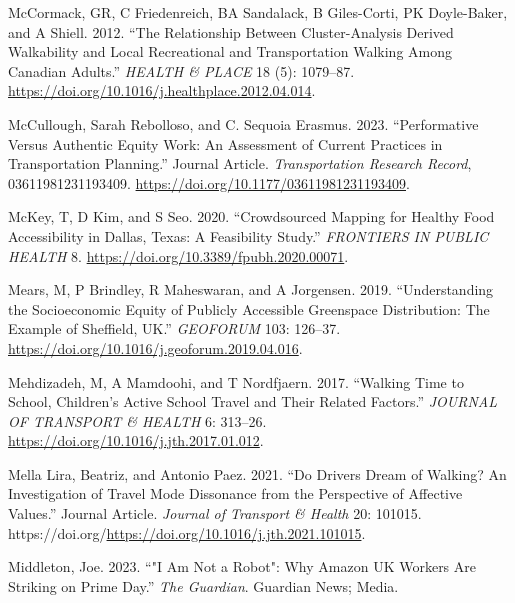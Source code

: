 \documentclass[12pt, oneside]{report}
\newlength{\cslhangindent}
\newlength{\cslentryspacingunit} %
\newenvironment{CSLReferences}[2] %
 {%
  \setlength{\parindent}{0pt}
  \ifodd #1
  \let\oldpar\par
  \def\par{\hangindent=\cslhangindent\oldpar}
  \fi
  \setlength{\parskip}{#2\cslentryspacingunit}
 }%
 {}
\begin{document}
\begin{CSLReferences}{1}{0}
\leavevmode{}%
McCormack, GR, C Friedenreich, BA Sandalack, B Giles-Corti, PK
Doyle-Baker, and A Shiell. 2012. {``The Relationship Between
Cluster-Analysis Derived Walkability and Local Recreational and
Transportation Walking Among {Canadian} Adults.''} \emph{HEALTH \&
PLACE} 18 (5): 1079--87.
\url{https://doi.org/10.1016/j.healthplace.2012.04.014}.

\leavevmode{}%
McCullough, Sarah Rebolloso, and C. Sequoia Erasmus. 2023.
{``Performative Versus Authentic Equity Work: An Assessment of Current
Practices in Transportation Planning.''} Journal Article.
\emph{Transportation Research Record}, 03611981231193409.
\url{https://doi.org/10.1177/03611981231193409}.

\leavevmode{}%
McKey, T, D Kim, and S Seo. 2020. {``Crowdsourced {Mapping} for {Healthy
Food Accessibility} in {Dallas}, {Texas}: {A Feasibility Study}.''}
\emph{FRONTIERS IN PUBLIC HEALTH} 8.
\url{https://doi.org/10.3389/fpubh.2020.00071}.

\leavevmode{}%
Mears, M, P Brindley, R Maheswaran, and A Jorgensen. 2019.
{``Understanding the Socioeconomic Equity of Publicly Accessible
Greenspace Distribution: {The} Example of {Sheffield}, {UK}.''}
\emph{GEOFORUM} 103: 126--37.
\url{https://doi.org/10.1016/j.geoforum.2019.04.016}.

\leavevmode{}%
Mehdizadeh, M, A Mamdoohi, and T Nordfjaern. 2017. {``Walking Time to
School, Children's Active School Travel and Their Related Factors.''}
\emph{JOURNAL OF TRANSPORT \& HEALTH} 6: 313--26.
\url{https://doi.org/10.1016/j.jth.2017.01.012}.

\leavevmode{}%
Mella Lira, Beatriz, and Antonio Paez. 2021. {``Do Drivers Dream of
Walking? An Investigation of Travel Mode Dissonance from the Perspective
of Affective Values.''} Journal Article. \emph{Journal of Transport \&
Health} 20: 101015.
https://doi.org/\url{https://doi.org/10.1016/j.jth.2021.101015}.

\leavevmode{}%
Middleton, Joe. 2023. {``"I Am Not a Robot": Why Amazon UK Workers Are
Striking on Prime Day.''} \emph{The Guardian}. Guardian News; Media.


\end{CSLReferences}
\end{document}
